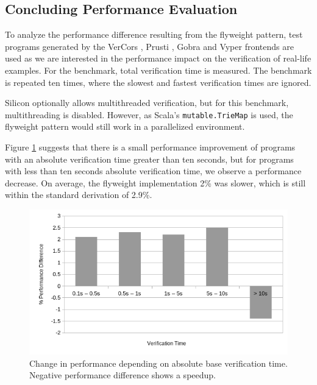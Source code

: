 \documentclass[11pt]{article}
\begin{document}
    \subsection{Concluding Performance Evaluation} \label{eval-conclusion}

    To analyze the performance difference resulting
    from the flyweight pattern, test programs generated by the VerCors \cite{vercors},
    Prusti \cite{prusti}, Gobra \cite{gobra} and Vyper \cite{vyper} frontends are used
    as we are interested in the performance impact on the verification of real-life examples.
    For the benchmark, total verification time  is measured.
    The benchmark is repeated ten times, where the
    slowest and fastest verification times are ignored.
    
    Silicon optionally
    allows multithreaded verification, but for this benchmark, multithreading
    is disabled. However, as Scala's \texttt{mutable.TrieMap} is used,
    the flyweight pattern would still work in a parallelized environment.
    
    Figure \ref{fig:absolute-verification-time-part-1} suggests that there is a small
    performance improvement of programs with an absolute verification time greater than
    ten seconds, but for programs with less than ten seconds absolute verification time,
    we observe a performance decrease.
    On average, the flyweight implementation 2\% was slower,
    which is still within the standard derivation of 2.9\%.

    \begin{figure}[H]
        \includegraphics[width=\linewidth]{performance-change-vs-verification-time-part-1.png}
        \caption{
            Change in performance depending on absolute base verification time. Negative performance difference shows a speedup.
        }
        \label{fig:absolute-verification-time-part-1}
    \end{figure}
\end{document}
